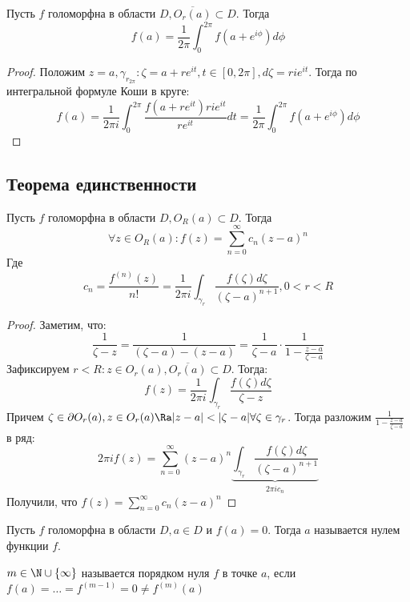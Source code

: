 
\begin{theorem}[О среднем]
    Пусть \(f\) голоморфна в области \(D, \overline{O_r(a)} \subset D\). Тогда
    \[f(a) = \frac{1}{2\pi}\int_0^{2\pi}f(a + e^{i\phi})d\phi\]
\end{theorem}
\begin{proof}
    Положим \(z = a, \gamma_{r_{2\pi}}: \zeta = a + re^{it}, t \in [0, 2\pi], d\zeta = rie^{it}\). Тогда по интегральной формуле Коши в круге:
    \[f(a) = \frac{1}{2\pi i}\int_0^{2\pi} \frac{f(a + re^{it})rie^{it}}{re^{it}}dt = \frac{1}{2\pi}\int_0^{2\pi}f(a + e^{i\phi})d\phi\]
\end{proof}

\subsection{Теорема единственности}

\begin{theorem}
    Пусть \(f\) голоморфна в области \(D, O_R(a) \subset D\). Тогда
    \[\forall z \in O_R(a): f(z) = \sum_{n = 0}^\infty c_n(z - a)^n\] 
    Где
    \[c_n = \frac{f^{(n)}(z)}{n!} = \frac{1}{2\pi i}\int_{\gamma_r}\frac{f(\zeta)d\zeta}{(\zeta - a)^{n + 1}}, 0 < r < R\]
\end{theorem}
\begin{proof}
    Заметим, что:
    \[\frac{1}{\zeta - z} = \frac{1}{(\zeta - a) - (z - a)} = \frac{1}{\zeta - a}\cdot \frac{1}{1 - \frac{z - a}{\zeta - a}}\]
    Зафиксируем \(r < R: z \in O_r(a), \overline{O_r(a)} \subset D\). Тогда:
    \[f(z) = \frac{1}{2\pi i}\int_{\gamma_r}\frac{f(\zeta)d\zeta}{\zeta - z}\]
    Причем \(\zeta \in \partial O_r(a), z \in O_r(a) \Ra |z - a| < |\zeta - a| \forall \zeta \in \gamma_r\). Тогда разложим \(\frac{1}{1 - \frac{z - a}{\zeta - a}}\) в ряд:
    \[2\pi i f(z) = \sum_{n = 0}^\infty (z - a)^n \underbrace{\int_{\gamma_r}\frac{f(\zeta)d\zeta}{(\zeta - a)^{n + 1}}}_{2\pi i c_n}\]
    Получили, что \(f(z) = \sum_{n = 0}^\infty c_n(z - a)^n\)
\end{proof}

\begin{definition}
    Пусть \(f\) голоморфна в области \(D, a \in D\) и \(f(a) = 0\). Тогда \(a\) называется нулем функции \(f\).
\end{definition}

\begin{definition}
    \(m \in \N \cup \{\infty\}\) называется порядком нуля \(f\) в точке \(a\), если \(f(a) = \dots = f^{(m - 1)} = 0 \ne f^{(m)}(a)\)
\end{definition}

